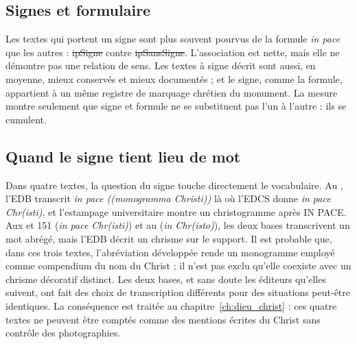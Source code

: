 \subsection{Signes et formulaire}

Les textes qui portent un signe sont plus souvent pourvus de la formule \emph{in pace} que les autres : \st{ipSigne} contre \st{ipSansSigne}. L’association est nette, mais elle ne démontre pas une relation de sens. Les textes à signe décrit sont aussi, en moyenne, mieux conservés et mieux documentés ; et le signe, comme la formule, appartient à un même registre de marquage chrétien du monument. La mesure montre seulement que signe et formule ne se substituent pas l’un à l’autre : ils se cumulent.

\subsection{Quand le signe tient lieu de mot}

Dans quatre textes, la question du signe touche directement le vocabulaire. Au , l’EDB transcrit \emph{in pace ((monogramma Christi))} là où l’EDCS donne \emph{in pace Chr(isti)}, et l’estampage universitaire montre un christogramme après IN PACE. Aux  et 151 (\emph{in pace Chr(isti)}) et au  (\emph{in Chr(isto)}), les deux bases transcrivent un mot abrégé, mais l’EDB décrit un chrisme sur le support. Il est probable que, dans ces trois textes, l’abréviation développée rende un monogramme employé comme compendium du nom du Christ ; il n’est pas exclu qu’elle coexiste avec un chrisme décoratif distinct. Les deux bases, et sans doute les éditeurs qu’elles suivent, ont fait des choix de transcription différents pour des situations peut-être identiques. La conséquence est traitée au chapitre~\ref{ch:dieu_christ} : ces quatre textes ne peuvent être comptés comme des mentions écrites du Christ sans contrôle des photographies.


